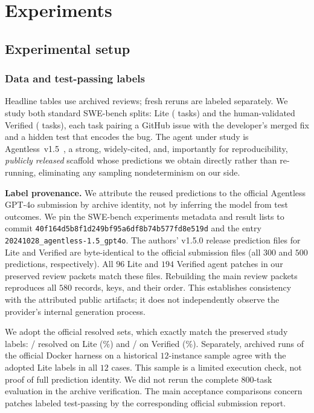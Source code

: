 \documentclass[10pt,conference]{IEEEtran}
\begin{document}
\section{Experiments}
\subsection{Experimental setup}
\subsubsection{Data and test-passing labels}
Headline tables use archived reviews; fresh reruns are labeled separately.
We study both standard SWE-bench splits: Lite (\nTotalLite{} tasks) and the human-validated
Verified (\nTotalVerified{} tasks), each task pairing a GitHub issue with the developer's
merged fix and a hidden test that encodes the bug. The agent under study is
Agentless~v1.5~\cite{agentless}, a strong, widely-cited, and, importantly for
reproducibility, \emph{publicly released} scaffold whose predictions we obtain directly rather
than re-running, eliminating any sampling nondeterminism on our side.

\textbf{Label provenance.} We attribute the reused predictions to the official Agentless
GPT-4o submission by archive identity, not by inferring the model from test outcomes. We pin
the SWE-bench experiments metadata and result lists to commit
\texttt{40f164d5b8f1d249bf95a6df8b74b577fd8e519d} and the entry
\texttt{20241028\_agentless-1.5\_gpt4o}. The authors' v1.5.0 release prediction files for Lite
and Verified are byte-identical to the official submission files (all $300$ and $500$
predictions, respectively). All $96$ Lite and $194$ Verified agent patches in our preserved
review packets match these files. Rebuilding the main review packets reproduces all $580$
records, keys, and their order. This establishes consistency with the attributed public
artifacts; it does not independently observe the provider's internal generation process.

We adopt the official resolved sets, which exactly match the preserved study labels:
\nResolvedLite{}/\nTotalLite{} resolved on Lite (\pctResolvedLite\%) and
\nResolvedVerified{}/\nTotalVerified{} on Verified (\pctResolvedVerified\%). Separately,
archived runs of the official Docker harness on a historical $12$-instance sample agree with
the adopted Lite labels in all $12$ cases. This sample is a limited execution check, not
proof of full prediction identity. We did not rerun the complete $800$-task evaluation in the
archive verification. The main acceptance comparisons concern patches labeled test-passing
by the corresponding official submission report.
\end{document}
